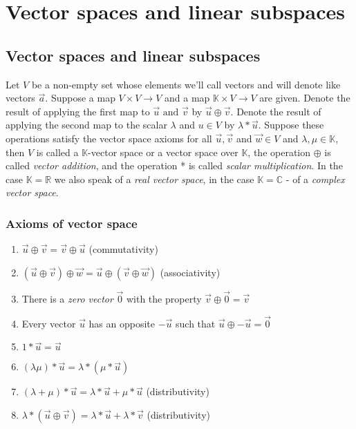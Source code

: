\section{Vector spaces and linear subspaces}


\subsection{Vector spaces and linear subspaces}
\begin{definition}
    Let $V$ be a non-empty set whose elements we'll call vectors and will denote like vectors $\vec{a}$.
    Suppose a map $V \times V \rightarrow V$ and a map $\mathbb{K} \times V \rightarrow V$ are given.
    Denote the result of applying the first map to $ \vec{u} \text{ and } \vec{v} $ by $ \vec{u} \oplus \vec{v} $.
    Denote the result of applying the second map to the scalar $ \lambda $ and $ u \in V $ by $ \lambda * \vec{u} $.
    Suppose these operations satisfy the vector space axioms for all $ \vec{u}, \vec{v} $ and $ \vec{w} \in V $ and $ \lambda, \mu \in \mathbb{K} $,
    then $V$ is called a $\mathbb{K}$-vector space or a vector space over $ \mathbb{K} $, the operation $ \oplus $ is called \emph{vector addition},
    and the operation * is called \emph{scalar multiplication}. In the case $ \mathbb{K} = \mathbb{R} $ we also speak of a \emph{real vector space}, in the
    case $ \mathbb{K} = \mathbb{C} $ - of a \emph{complex vector space}.
\end{definition}


\subsubsection{Axioms of vector space}
    \begin{enumerate}
        \item $ \vec{u} \oplus \vec{v} = \vec{v} \oplus \vec{u} $ (commutativity)
        \item $ (\vec{u} \oplus \vec{v}) \oplus \vec{w} = \vec{u} \oplus (\vec{v} \oplus \vec{w}) $ (associativity)
        \item There is a \emph{zero vector} $ \vec{0} $ with the property $ \vec{v} \oplus \vec{0} = \vec{v} $
        \item Every vector $ \vec{u} $ has an opposite $ -\vec{u} $ such that $ \vec{u} \oplus -\vec{u} = \vec{0} $
        \item $ 1 * \vec{u} = \vec{u} $
        \item $ (\lambda\mu)*\vec{u} = \lambda * (\mu * \vec{u}) $
        \item $ (\lambda + \mu)*\vec{u} = \lambda * \vec{u} + \mu * \vec{u} $ (distributivity)
        \item $ \lambda * (\vec{u} \oplus \vec{v}) = \lambda*\vec{u}+\lambda*\vec{v} $ (distributivity)
    \end{enumerate}


